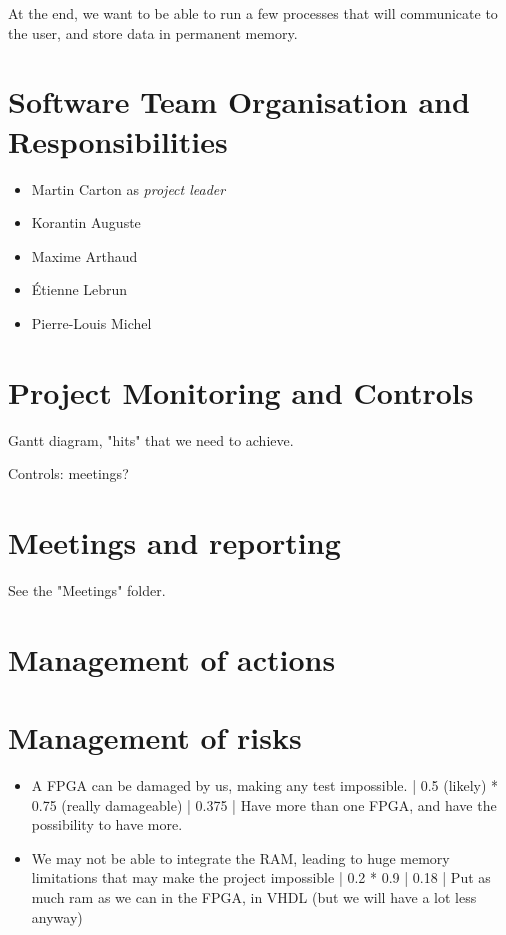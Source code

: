 \documentclass{article}
\begin{document}
    At the end, we want to be able to run a few processes that will communicate
    to the user, and store data in permanent memory.

  \section{Software Team Organisation and Responsibilities}
    \begin{itemize}
      \item Martin Carton as \textit{project leader}
      \item Korantin Auguste
      \item Maxime Arthaud
      \item Étienne Lebrun
      \item Pierre-Louis Michel
    \end{itemize}

  \section{Project Monitoring and Controls}
    \afterpage{}

    Gantt diagram, "hits" that we need to achieve.

    Controls: meetings?

  \section{Meetings and reporting}
    See the "Meetings" folder.

  \section{Management of actions}

  \section{Management of risks}
    \begin{itemize}
      \item A FPGA can be damaged by us, making any test impossible. | 0.5
        (likely) * 0.75 (really damageable) | 0.375 | Have more than one FPGA,
        and have the possibility to have more.
      \item We may not be able to integrate the RAM, leading to huge memory
        limitations that may make the project impossible | 0.2 * 0.9 | 0.18 |
        Put as much ram as we can in the FPGA, in VHDL (but we will have a lot
        less anyway)
    \end{itemize}
\end{document}
